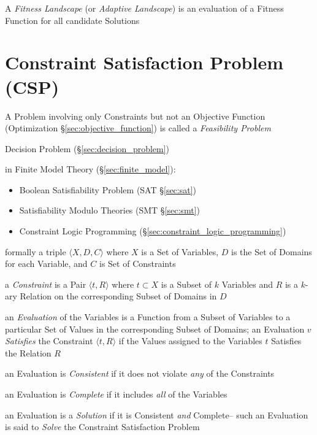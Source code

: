 A \emph{Fitness Landscape} (or \emph{Adaptive Landscape}) is an
evaluation of a Fitness Function for all candidate Solutions %



\section{Constraint Satisfaction Problem (CSP)}
\label{sec:constraint_satisfaction}

A Problem involving only Constraints but not an Objective Function
(Optimization \S\ref{sec:objective_function}) is called a \emph{Feasibility
  Problem}

\fist Decision Problem (\S\ref{sec:decision_problem})

in Finite Model Theory (\S\ref{sec:finite_model}):
\begin{itemize}
  \item Boolean Satisfiability Problem (SAT \S\ref{sec:sat})
  \item Satisfiability Modulo Theories (SMT \S\ref{sec:smt})
  \item Constraint Logic Programming (\S\ref{sec:constraint_logic_programming})
\end{itemize}


formally a triple $\langle{X,D,C}\rangle$ where $X$ is a Set of Variables, $D$
is the Set of Domains for each Variable, and $C$ is Set of Constraints

a \emph{Constraint} is a Pair $\langle{t,R}\rangle$ where $t \subset X$ is a
Subset of $k$ Variables and $R$ is a $k$-ary Relation on the corresponding
Subset of Domains in $D$

an \emph{Evaluation} of the Variables is a Function from a Subset of Variables
to a particular Set of Values in the corresponding Subset of Domains; an
Evaluation $v$ \emph{Satisfies} the Constraint $\langle{t,R}\rangle$ if the
Values assigned to the Variables $t$ Satisfies the Relation $R$

an Evaluation is \emph{Consistent} if it does not violate \emph{any} of the
Constraints

an Evaluation is \emph{Complete} if it includes \emph{all} of the Variables

an Evaluation is a \emph{Solution} if it is Consistent \emph{and} Complete--
such an Evaluation is said to \emph{Solve} the Constraint Satisfaction Problem

